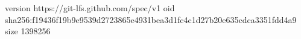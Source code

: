 version https://git-lfs.github.com/spec/v1
oid sha256:f19436f19b9e9539d2723865e4931bea3d1fc4c1d27b20e635cdca3351fdd4a9
size 1398256
